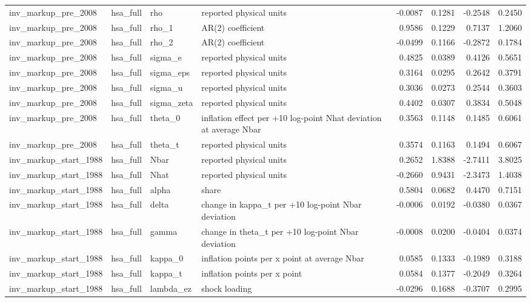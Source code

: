 \begin{tabular}{llllrrrr}
inv\_markup\_pre\_2008 & hsa\_full & rho & reported physical units & -0.0087 & 0.1281 & -0.2548 & 0.2450 \\
inv\_markup\_pre\_2008 & hsa\_full & rho\_1 & AR(2) coefficient & 0.9586 & 0.1229 & 0.7137 & 1.2060 \\
inv\_markup\_pre\_2008 & hsa\_full & rho\_2 & AR(2) coefficient & -0.0499 & 0.1166 & -0.2872 & 0.1784 \\
inv\_markup\_pre\_2008 & hsa\_full & sigma\_e & reported physical units & 0.4825 & 0.0389 & 0.4126 & 0.5651 \\
inv\_markup\_pre\_2008 & hsa\_full & sigma\_eps & reported physical units & 0.3164 & 0.0295 & 0.2642 & 0.3791 \\
inv\_markup\_pre\_2008 & hsa\_full & sigma\_u & reported physical units & 0.3036 & 0.0273 & 0.2544 & 0.3603 \\
inv\_markup\_pre\_2008 & hsa\_full & sigma\_zeta & reported physical units & 0.4402 & 0.0307 & 0.3834 & 0.5048 \\
inv\_markup\_pre\_2008 & hsa\_full & theta\_0 & inflation effect per +10 log-point Nhat deviation at average Nbar & 0.3563 & 0.1148 & 0.1485 & 0.6061 \\
inv\_markup\_pre\_2008 & hsa\_full & theta\_t & reported physical units & 0.3574 & 0.1163 & 0.1494 & 0.6067 \\
inv\_markup\_start\_1988 & hsa\_full & Nbar & reported physical units & 0.2652 & 1.8388 & -2.7411 & 3.8025 \\
inv\_markup\_start\_1988 & hsa\_full & Nhat & reported physical units & -0.2660 & 0.9431 & -2.3473 & 1.4038 \\
inv\_markup\_start\_1988 & hsa\_full & alpha & share & 0.5804 & 0.0682 & 0.4470 & 0.7151 \\
inv\_markup\_start\_1988 & hsa\_full & delta & change in kappa\_t per +10 log-point Nbar deviation & -0.0006 & 0.0192 & -0.0380 & 0.0367 \\
inv\_markup\_start\_1988 & hsa\_full & gamma & change in theta\_t per +10 log-point Nbar deviation & -0.0008 & 0.0200 & -0.0404 & 0.0374 \\
inv\_markup\_start\_1988 & hsa\_full & kappa\_0 & inflation points per x point at average Nbar & 0.0585 & 0.1333 & -0.1989 & 0.3188 \\
inv\_markup\_start\_1988 & hsa\_full & kappa\_t & inflation points per x point & 0.0584 & 0.1377 & -0.2049 & 0.3264 \\
inv\_markup\_start\_1988 & hsa\_full & lambda\_ez & shock loading & -0.0296 & 0.1688 & -0.3707 & 0.2995 \\

\end{tabular}
